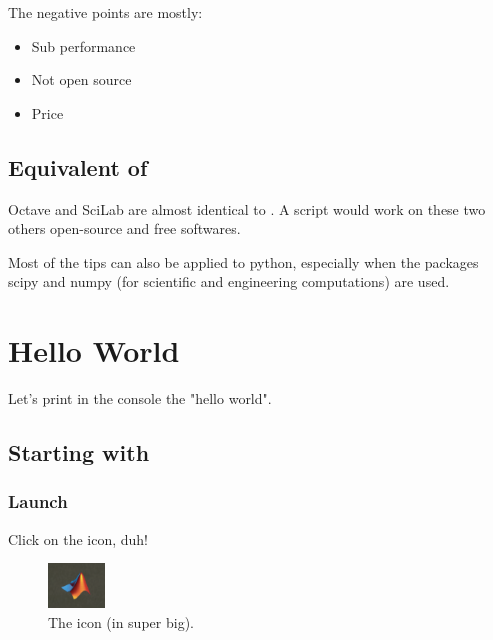		The negative points are mostly:
		\begin{itemize}
			\item Sub performance
			\item Not open source
			\item {\color{red} Price}
		\end{itemize}

	\subsection{Equivalent of \matlab }

		Octave and SciLab are almost identical to \matlab. A \matlab script would work on these two others open-source and free softwares.

		Most of the tips can also be applied to python, especially when the packages scipy and numpy (for scientific and engineering computations) are used.


\section{Hello World}
	Let's print in the console the "hello world".
	\subsection{Starting with \matlab}
		\subsubsection{Launch \matlab}
		Click on the icon, duh!
		\begin{figure}
			\center
			\includegraphics[width=0.45\linewidth]{./fig/icon_matlab.PNG}
			\caption{
				The \matlab icon (in super big).
			}
			\label{fig-matlab_icon}
		\end{figure}

